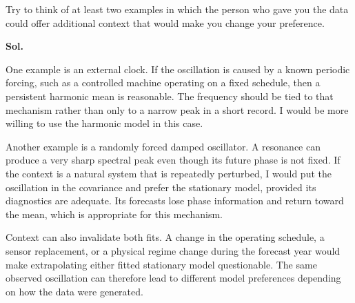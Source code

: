 \documentclass[lang=en,11pt,a4paper,citestyle =authoryear,nobib=true]{elegantpaper}
\begin{document}
\vspace{1em}

\item Try to think of at least two examples in which the person who gave
you the data could offer additional context that would make you change
your preference.

\par\vspace{0.5em}\noindent\textbf{Sol.}\par
One example is an external clock. If the oscillation is caused by a
known periodic forcing, such as a controlled machine operating on a fixed
schedule, then a persistent harmonic mean is reasonable. The frequency
should be tied to that mechanism rather than only to a narrow peak in a
short record. I would be more willing to use the harmonic model in this case.

Another example is a randomly forced damped oscillator. A resonance can
produce a very sharp spectral peak even though its future phase is not
fixed. If the context is a natural system that is repeatedly perturbed,
I would put the oscillation in the covariance and prefer the stationary
model, provided its diagnostics are adequate. Its forecasts lose phase
information and return toward the mean, which is appropriate for this
mechanism.

Context can also invalidate both fits. A change in the operating schedule,
a sensor replacement, or a physical regime change during the forecast
year would make extrapolating either fitted stationary model questionable.
The same observed oscillation can therefore lead to different model
preferences depending on how the data were generated.

\vspace{1em}
\end{document}
